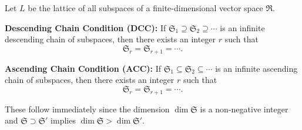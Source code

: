 Let $L$ be the lattice of all subspaces of a finite-dimensional vector space $\mathfrak{R}$.

\textbf{Descending Chain Condition (DCC):} If $\mathfrak{S}_1 \supseteq \mathfrak{S}_2 \supseteq \cdots$ is an infinite descending chain of subspaces, then there exists an integer $r$ such that
$$
\mathfrak{S}_r = \mathfrak{S}_{r+1} = \cdots.
$$

\textbf{Ascending Chain Condition (ACC):} If $\mathfrak{S}_1 \subseteq \mathfrak{S}_2 \subseteq \cdots$ is an infinite ascending chain of subspaces, then there exists an integer $r$ such that
$$
\mathfrak{S}_r = \mathfrak{S}_{r+1} = \cdots.
$$

These follow immediately since the dimension $\dim \mathfrak{S}$ is a non-negative integer and $\mathfrak{S} \supset \mathfrak{S}'$ implies $\dim \mathfrak{S} > \dim \mathfrak{S}'$.
